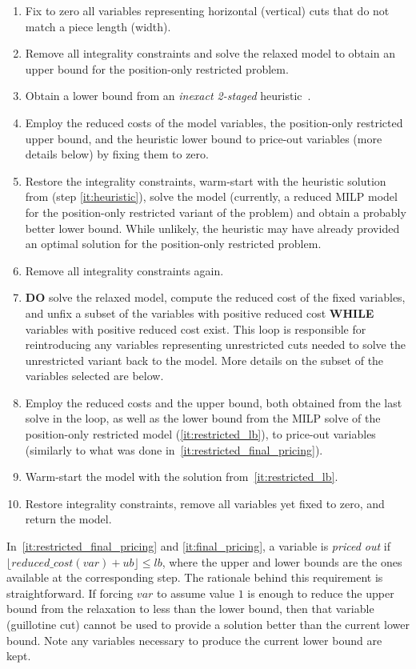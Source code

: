 \documentclass[ppgc,tese,english,formais,babel]{iiufrgs}
\begin{document}
\begin{enumerate}
\item Fix to zero all variables representing horizontal (vertical) cuts that do not match a piece length (width).
\item Remove all integrality constraints and solve the relaxed model to obtain an upper bound for the position-only restricted problem.
\item Obtain a lower bound from an \emph{inexact 2-staged} heuristic~\citep{furini:2016,dolatabadi:2012}.\label{it:heuristic}
\item Employ the reduced costs of the model variables, the position-only restricted upper bound, and the heuristic lower bound to price-out variables (more details below) by fixing them to zero.\label{it:restricted_final_pricing}
\item Restore the integrality constraints, warm-start with the heuristic solution from (step \autoref{it:heuristic}), solve the model (currently, a reduced MILP model for the position-only restricted variant of the problem) and obtain a probably better lower bound. While unlikely, the heuristic may have already provided an optimal solution for the position-only restricted problem.\label{it:restricted_lb}
\item Remove all integrality constraints again.
\item \textbf{DO} solve the relaxed model, compute the reduced cost of the fixed variables, and unfix a subset of the variables with positive reduced cost \textbf{WHILE} variables with positive reduced cost exist. This loop is responsible for reintroducing any variables representing unrestricted cuts needed to solve the unrestricted variant back to the model. More details on the subset of the variables selected are below.\label{it:loop}
\item Employ the reduced costs and the upper bound, both obtained from the last solve in the loop, as well as the lower bound from the MILP solve of the position-only restricted model (\autoref{it:restricted_lb}), to price-out variables (similarly to what was done in~\autoref{it:restricted_final_pricing}).\label{it:final_pricing}
\item Warm-start the model with the solution from~\autoref{it:restricted_lb}.
\item Restore integrality constraints, remove all variables yet fixed to zero, and return the model.
\end{enumerate}

In~\autoref{it:restricted_final_pricing} and \autoref{it:final_pricing}, a variable is \emph{priced out} if \(\lfloor reduced\_cost(var) + ub \rfloor \leq lb\), where the upper and lower bounds are the ones available at the corresponding step. The rationale behind this requirement is straightforward. If forcing \(var\) to assume value \(1\) is enough to reduce the upper bound from the relaxation to less than the lower bound, then that variable (guillotine cut) cannot be used to provide a solution better than the current lower bound. Note any variables necessary to produce the current lower bound are kept.
\end{document}
